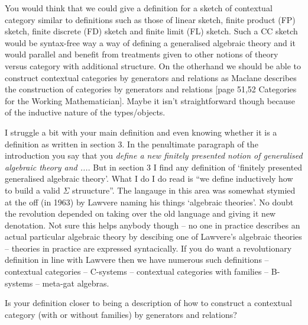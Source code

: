 \note
You would think that we could give a definition for a sketch of contextual category 
similar to  definitions such as those of linear sketch, finite product (FP) sketch, finite discrete (FD) sketch and finite limit (FL) sketch. Such a CC sketch would be syntax-free way a way of defining a generalised algebraic theory and it would parallel and benefit from treatments given to other notions of theory versus category with additional structure. 
On the otherhand we should be able to construct contextual categories by generators and  
relations as Maclane describes the construction of categories by generators and relations
[page 51,52 Categories for the Working Mathematician]. Maybe it isn't  straightforward  though because of the inductive nature of the types/objects. 
\begin{notebox}
I struggle a bit with your main definition and even knowing whether it is a definition as written in section 3. In the penultimate paragraph of the introduction you say that you \textit{define
a new finitely presented notion of generalised algebraic theory and ...}. But in section 3 I find  any definition of `finitely presented generalised algebraic theory'.  What I do I do read is
``we define inductively how to build a valid $\Sigma$ struucture''.
The langauge in this area was somewhat stymied at the off (in 1963) by Lawvere 
naming his things `algebraic theories'. No doubt the revolution depended on 
taking over the old language and giving it new denotation. Not sure this helps anybody though -- no one in practice describes an actual particular algebraic theory by descibing one of Lawvere's algebraic theories  -- theories in practice are expressed syntacically. If you do want a revolutionary definition in line with Lawvere then we have numerous such definitions --  contextual categories -- C-systems -- contextual categories with families -- B-systems -- meta-gat algebras.   

Is your definition closer to being a description of how to construct a contextual category
(with or without families) by generators and relations?
\end{notebox}

